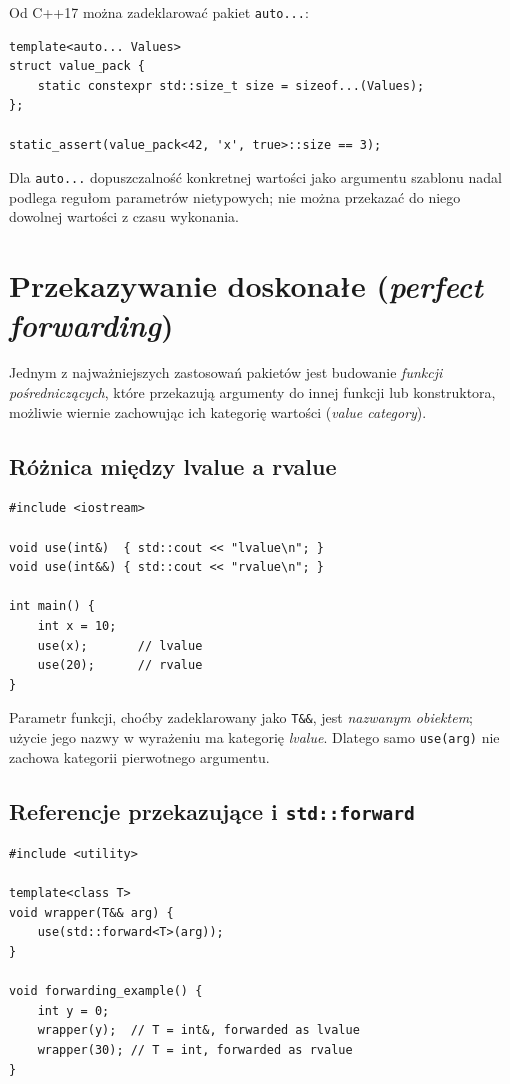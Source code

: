 Od C++17 można zadeklarować pakiet \texttt{auto...}:

\begin{lstlisting}
template<auto... Values>
struct value_pack {
    static constexpr std::size_t size = sizeof...(Values);
};

static_assert(value_pack<42, 'x', true>::size == 3);
\end{lstlisting}

Dla \texttt{auto...} dopuszczalność konkretnej wartości jako
argumentu szablonu nadal podlega regułom parametrów nietypowych;
nie można przekazać do niego dowolnej wartości z czasu wykonania.

\section{Przekazywanie doskonałe (\textit{perfect forwarding})}
\label{sec:variadic-forwarding}

Jednym z najważniejszych zastosowań pakietów jest budowanie
\emph{funkcji pośredniczących}, które przekazują argumenty do
innej funkcji lub konstruktora, możliwie wiernie zachowując
ich kategorię wartości (\emph{value category}).

\subsection{Różnica między lvalue a rvalue}

\begin{lstlisting}
#include <iostream>

void use(int&)  { std::cout << "lvalue\n"; }
void use(int&&) { std::cout << "rvalue\n"; }

int main() {
    int x = 10;
    use(x);       // lvalue
    use(20);      // rvalue
}
\end{lstlisting}

Parametr funkcji, choćby zadeklarowany jako \texttt{T\&\&}, jest
\emph{nazwanym obiektem}; użycie jego nazwy w wyrażeniu ma
kategorię \emph{lvalue}. Dlatego samo \texttt{use(arg)}
nie zachowa kategorii pierwotnego argumentu.

\subsection{Referencje przekazujące i \texttt{std::forward}}

\begin{lstlisting}
#include <utility>

template<class T>
void wrapper(T&& arg) {
    use(std::forward<T>(arg));
}

void forwarding_example() {
    int y = 0;
    wrapper(y);  // T = int&, forwarded as lvalue
    wrapper(30); // T = int, forwarded as rvalue
}
\end{lstlisting}

